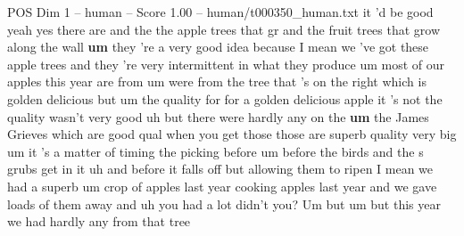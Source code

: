 \begin{textsample}{POS Dim 1 – human – Score 1.00 – human/t000350\_human.txt}  \label{ex:f1_pos_008}
it 'd be good yeah yes there are and the the apple trees that gr and the fruit trees that grow along the wall \textbf{um} they 're a very good idea because I mean we 've got these apple trees and they 're very intermittent in what they produce um most of our apples this year are from um were from the tree that 's on the right which is golden delicious but um the quality for for a golden delicious apple it 's not the quality wasn't very good uh but there were hardly any on the \textbf{um} the James Grieves which are good qual when you get those those are superb quality very big um it 's a matter of timing the picking before um before the birds and the s grubs get in it uh and before it falls off but allowing them to ripen I mean we had a superb um crop of apples last year cooking apples last year and we gave loads of them away and uh you had a lot didn't you?
Um but um but this year we had hardly any from that tree

\end{textsample}

